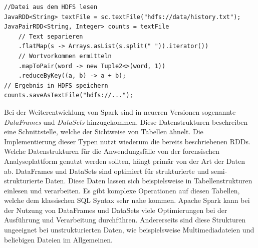 \begin{lstlisting}[label={lst:spark_rdd_word_count},caption= Beispielimplementierung eines Spark RDDs ,captionpos=b,frame=single,style=customjava]
//Datei aus dem HDFS lesen
JavaRDD<String> textFile = sc.textFile("hdfs://data/history.txt");
JavaPairRDD<String, Integer> counts = textFile
    // Text separieren
    .flatMap(s -> Arrays.asList(s.split(" ")).iterator())
    // Wortvorkommen ermitteln
    .mapToPair(word -> new Tuple2<>(word, 1))
    .reduceByKey((a, b) -> a + b);
// Ergebnis in HDFS speichern
counts.saveAsTextFile("hdfs://...");
\end{lstlisting}


\noindent
Bei der Weiterentwicklung von Spark sind in neueren Versionen sogenannte \textit{DataFrames} und \textit{DataSets} hinzugekommen. Diese Datenstrukturen beschreiben eine Schnittstelle, welche der Sichtweise von Tabellen ähnelt. Die Implementierung dieser Typen nutzt wiederum die bereits beschriebenen RDDs.\\
Welche Datenstrukturen für die Anwendungsfälle von der forensischen Analyseplattform genutzt werden sollten, hängt primär von der Art der Daten ab.
DataFrames und DataSets sind optimiert für strukturierte und semi-strukturierte Daten. Diese Daten lassen sich beispielsweise in Tabellenstrukturen einlesen und verarbeiten. Es gibt komplexe Operationen auf diesen Tabellen, welche dem klassischen SQL Syntax sehr nahe kommen. Apache Spark kann bei der Nutzung von DataFrames und DataSets viele Optimierungen bei der Ausführung und Verarbeitung durchführen. Andererseits sind diese Strukturen ungeeignet bei unstrukturierten Daten, wie beispielsweise Multimediadateien und beliebigen Dateien im Allgemeinen.\cite[S. 66 ff.]{data_processing_spark2}\\

